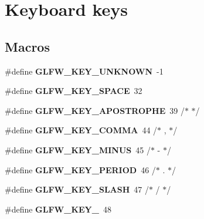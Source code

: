 \hypertarget{group__keys}{}\section{Keyboard keys}
\label{group__keys}
\subsection*{Macros}
\begin{DoxyCompactItemize}
\item 
\hypertarget{group__keys_ga99aacc875b6b27a072552631e13775c7}{}\#define {\bfseries G\+L\+F\+W\+\_\+\+K\+E\+Y\+\_\+\+U\+N\+K\+N\+O\+W\+N}~-\/1\label{group__keys_ga99aacc875b6b27a072552631e13775c7}

\item 
\hypertarget{group__keys_gaddb2c23772b97fd7e26e8ee66f1ad014}{}\#define {\bfseries G\+L\+F\+W\+\_\+\+K\+E\+Y\+\_\+\+S\+P\+A\+C\+E}~32\label{group__keys_gaddb2c23772b97fd7e26e8ee66f1ad014}

\item 
\hypertarget{group__keys_ga6059b0b048ba6980b6107fffbd3b4b24}{}\#define {\bfseries G\+L\+F\+W\+\_\+\+K\+E\+Y\+\_\+\+A\+P\+O\+S\+T\+R\+O\+P\+H\+E}~39  /$\ast$ \textquotesingle{} $\ast$/\label{group__keys_ga6059b0b048ba6980b6107fffbd3b4b24}

\item 
\hypertarget{group__keys_gab3d5d72e59d3055f494627b0a524926c}{}\#define {\bfseries G\+L\+F\+W\+\_\+\+K\+E\+Y\+\_\+\+C\+O\+M\+M\+A}~44  /$\ast$ , $\ast$/\label{group__keys_gab3d5d72e59d3055f494627b0a524926c}

\item 
\hypertarget{group__keys_gac556b360f7f6fca4b70ba0aecf313fd4}{}\#define {\bfseries G\+L\+F\+W\+\_\+\+K\+E\+Y\+\_\+\+M\+I\+N\+U\+S}~45  /$\ast$ -\/ $\ast$/\label{group__keys_gac556b360f7f6fca4b70ba0aecf313fd4}

\item 
\hypertarget{group__keys_ga37e296b650eab419fc474ff69033d927}{}\#define {\bfseries G\+L\+F\+W\+\_\+\+K\+E\+Y\+\_\+\+P\+E\+R\+I\+O\+D}~46  /$\ast$ . $\ast$/\label{group__keys_ga37e296b650eab419fc474ff69033d927}

\item 
\hypertarget{group__keys_gadf3d753b2d479148d711de34b83fd0db}{}\#define {\bfseries G\+L\+F\+W\+\_\+\+K\+E\+Y\+\_\+\+S\+L\+A\+S\+H}~47  /$\ast$ / $\ast$/\label{group__keys_gadf3d753b2d479148d711de34b83fd0db}

\item 
\hypertarget{group__keys_ga50391730e9d7112ad4fd42d0bd1597c1}{}\#define {\bfseries G\+L\+F\+W\+\_\+\+K\+E\+Y\+\_}~48\label{group__keys_ga50391730e9d7112ad4fd42d0bd1597c1}


\end{DoxyCompactItemize}
